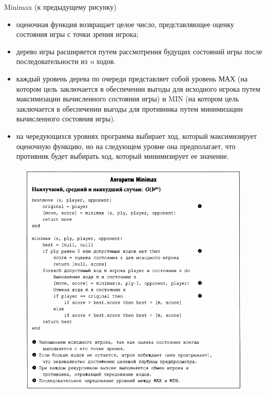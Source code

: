 \documentclass{beamer}
\begin{document}
\begin{frame}{Minimax (к предыдущему рисунку)}
\begin{itemize}
\item оценочная функция возвращает целое число, представляющее оценку состояния игры с точки зрения игрока;
\item дерево игры расширяется путем рассмотрения будущих состояний игры после последовательности из \textit{n} ходов. 
\item каждый уровень дерева по очереди представляет собой уровень МАХ (на котором цель заключается в обеспечении выгоды для исходного игрока путем максимизации вычисленного состояния игры) и MIN (на котором цель заключается в обеспечении выгоды для противника путем минимизации вычисленного состояния игры). 
\item на чередующихся уровнях программа выбирает ход, который максимизирует оценочную функцию, но на следующем уровне она предполагает, что противник будет выбирать ход, который минимизирует ее значение.
\end{itemize}
\end{frame}

\begin{frame}
\begin{figure}[h]
\centering
\includegraphics[scale=0.4]{images/lec05-pic03.png}
\end{figure}
\end{frame}
\end{document}
